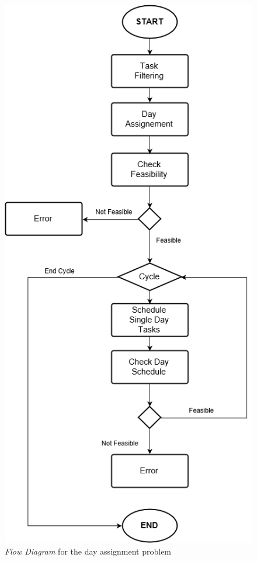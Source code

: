 \begin{figure}[H]
    \centering
    \includegraphics[scale=0.6]{Pictures/FlowDiagram/Algorithm2.png}
    \caption{\emph{Flow Diagram} for the day assignment problem}
    \label{fig:my_label}
\end{figure}